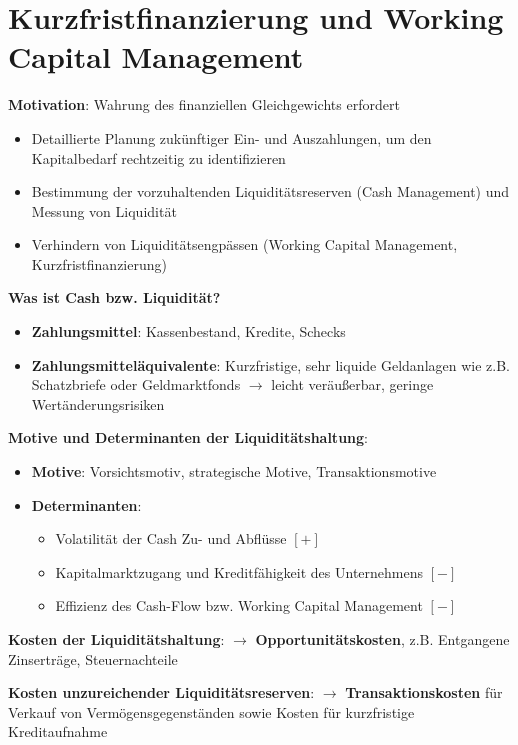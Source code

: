 \section{Kurzfristfinanzierung und Working Capital Management}

\textbf{Motivation}: Wahrung des finanziellen Gleichgewichts erfordert
\begin{itemize}
	\item Detaillierte Planung zukünftiger Ein- und Auszahlungen, um den Kapitalbedarf rechtzeitig zu identifizieren
	\item Bestimmung der vorzuhaltenden Liquiditätsreserven (Cash Management) und Messung von Liquidität
	\item Verhindern von Liquiditätsengpässen (Working Capital Management, Kurzfristfinanzierung)
\end{itemize}
\bigskip
\textbf{Was ist Cash bzw. Liquidität?}
\begin{itemize}
	\item \textbf{Zahlungsmittel}: Kassenbestand, Kredite, Schecks
	\item \textbf{Zahlungsmitteläquivalente}: Kurzfristige, sehr liquide Geldanlagen wie z.B. Schatzbriefe oder Geldmarktfonds $\rightarrow$ leicht veräußerbar, geringe Wertänderungsrisiken
\end{itemize}
\bigskip
\textbf{Motive und Determinanten der Liquiditätshaltung}:
\begin{itemize}
	\item \textbf{Motive}: Vorsichtsmotiv, strategische Motive, Transaktionsmotive
	\item \textbf{Determinanten}:
	\begin{itemize}
		\item Volatilität der Cash Zu- und Abflüsse $[+]$
		\item Kapitalmarktzugang und Kreditfähigkeit des Unternehmens $[-]$
		\item Effizienz des Cash-Flow bzw. Working Capital Management $[-]$
	\end{itemize}
\end{itemize}
\bigskip
\textbf{Kosten der Liquiditätshaltung}: $\rightarrow$ \textbf{Opportunitätskosten}, z.B. Entgangene Zinserträge, Steuernachteile

\textbf{Kosten unzureichender Liquiditätsreserven}: $\rightarrow$ \textbf{Transaktionskosten} für Verkauf von Vermögensgegenständen sowie Kosten für kurzfristige Kreditaufnahme 

